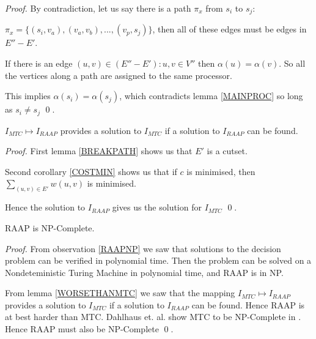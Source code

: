 \documentclass{article}
\begin{document}
\begin{proof}
By contradiction, let us say there is a path $\pi_x$ from $s_i$ to $s_j$:

$\pi_x = \{(s_i, v_a), (v_a, v_b), ..., (v_p, s_j)\}$, then all of these edges must be edges in $E'' - E'$.

If there is an edge $(u,v) \in (E''-E') : u, v \in V''$ then $\alpha(u) = \alpha(v)$.
So all the vertices along a path are assigned to the same processor.

This implies $\alpha(s_i) = \alpha(s_j)$, which contradicts lemma \ref{MAINPROC} so long as $s_i \neq s_j$ \qed.
\end{proof}

\begin{lemma}
\label{WORSETHANMTC}
$I_{MTC} \mapsto I_{RAAP}$ provides a solution to $I_{MTC}$ if a solution to $I_{RAAP}$ can be found.
\end{lemma}

\begin{proof}
First lemma \ref{BREAKPATH} shows us that $E'$ is a cutset.

Second corollary \ref{COSTMIN} shows us that if $c$ is minimised, then $\displaystyle\sum\limits_{(u,v) \in E'} w(u,v)$ is minimised.

Hence the solution to $I_{RAAP}$ gives us the solution for $I_{MTC}$ \qed.
\end{proof}

\begin{theorem}
\label{RAAPNPC}
RAAP is NP-Complete.
\end{theorem}

\begin{proof}
From observation \ref{RAAPNP} we saw that solutions to the decision problem can be verified in polynomial time.
Then the problem can be solved on a Nondeteministic Turing Machine in polynomial time, and RAAP is in NP.

From lemma \ref{WORSETHANMTC} we saw that the mapping $I_{MTC} \mapsto I_{RAAP}$ provides a solution to $I_{MTC}$ if a solution to $I_{RAAP}$ can be found.
Hence RAAP is at best harder than MTC.
Dahlhaus et. al. show MTC to be NP-Complete in \cite{dah94}.
Hence RAAP must also be NP-Complete \qed.

\end{proof}



\end{document}
